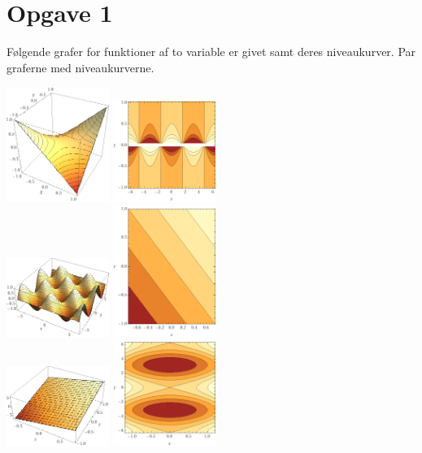 \section*{Opgave 1}
Følgende grafer for funktioner af to variable er givet samt deres niveaukurver. Par graferne med niveaukurverne.
\begin{center}
\includegraphics[width=0.25\textwidth]{Billeder/xy.png}
\includegraphics[width=0.25\textwidth]{Billeder/cosxyniveau.png}\\
\includegraphics[width=0.25\textwidth]{Billeder/cossin.png}
\includegraphics[width=0.25\textwidth]{Billeder/planeniveau.png} \\
\includegraphics[width=0.25\textwidth]{Billeder/plane.png}
\includegraphics[width=0.25\textwidth]{Billeder/cosxxniveau.png}\\

\end{center}
